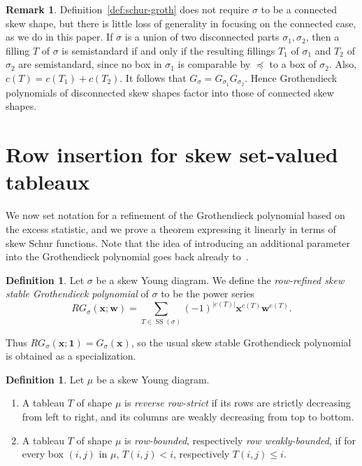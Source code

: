 \documentclass[11pt]{article}
\theoremstyle{definition}
\newtheorem{defi}[theorem]{Definition}
\newtheorem{rema}[theorem]{Remark}
\DeclareMathOperator{\Semi}{SS}
\begin{document}
\begin{rema} \label{rem:disconn}
Definition~\ref{def:schur-groth} does not require $\sigma$ to be a connected skew shape, but there is little loss of generality in focusing on the connected case, as we do in this paper. If $\sigma$ is a union of two disconnected parts $\sigma_1, \sigma_2$, then a filling $T$ of $\sigma$ is semistandard if and only if the resulting fillings $T_1$ of $\sigma_1$ and $T_2$ of $\sigma_2$ are semistandard, since no box in $\sigma_1$ is comparable by $\preceq$ to a box of $\sigma_2$. Also, $c(T) = c(T_1) + c(T_2)$. It follows that $G_\sigma = G_{\sigma_1} G_{\sigma_2}$. Hence Grothendieck polynomials of disconnected skew shapes factor into those of connected skew shapes.
\end{rema}

\section{Row insertion for skew set-valued tableaux}

We now set notation for a refinement of the Grothendieck polynomial based on the excess statistic, and we prove a theorem expressing it linearly in terms of skew Schur functions. Note that the idea of introducing an additional parameter into the Grothendieck polynomial goes back already to~\cite{fomin-kirillov-grothendieck}.

\begin{defi} \label{def:rg} Let $\sigma$ be a skew Young diagram.
We define the \emph{row-refined skew stable Grothendieck polynomial} of $\sigma$ to be the power series 
\[
RG_\sigma(\mathbf{x};\mathbf{w}) = \sum_{T\in \Semi(\sigma)} (-1)^{|e(T)|} \mathbf{x}^{c(T)} \mathbf{w}^{e(T)}.
\]
\end{defi}
\noindent Thus $RG_\sigma(\mathbf{x};\mathbf{1}) = G_\sigma(\mathbf{x})$, so the usual skew stable Grothendieck polynomial is obtained as a specialization.


\begin{defi}Let $\mu$ be a skew Young diagram.
\begin{enumerate}
\item\label{defi3.2_1} A tableau $T$ of shape $\mu$ is \emph{reverse row-strict} if its rows are strictly decreasing from left to right, and its columns are weakly decreasing from top to bottom. 
\item\label{defi3.2_2} A tableau $T$ of shape $\mu$ is \emph{row-bounded}, respectively \emph{row weakly-bounded}, if for every box $(i,j)$ in $\mu$, $T(i,j) < i$, respectively $T(i,j)\le i$.
\end{enumerate}
\end{defi}
\end{document}
